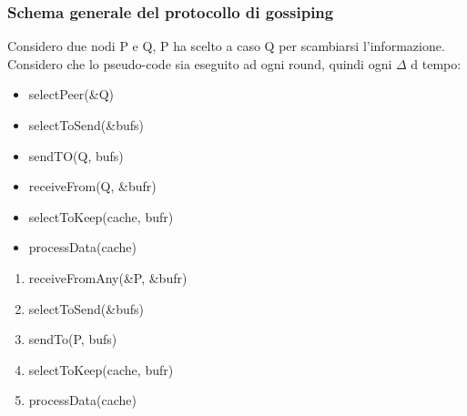 \documentclass{article}
\begin{document}
\subsubsection{Schema generale del protocollo di gossiping}
Considero due nodi P e Q, P ha scelto a caso Q per scambiarsi l'informazione. Considero che lo pseudo-code sia eseguito ad ogni round, quindi ogni $\Delta$ d tempo:
\begin{itemize}
\item selectPeer(\&Q)
\item selectToSend(\&bufs)
\item sendTO(Q, bufs)
\item receiveFrom(Q, \&bufr)
\item selectToKeep(cache, bufr)
\item processData(cache)
\end{itemize}
\begin{enumerate}
\item receiveFromAny(\&P, \&bufr)
\item selectToSend(\&bufs)
\item sendTo(P, bufs)
\item selectToKeep(cache, bufr)
\item processData(cache)
\end{enumerate}
\end{document}
